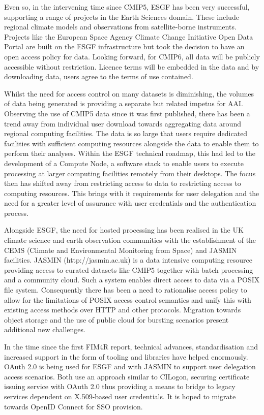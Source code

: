 \documentclass[fleqn,10pt]{wlscirep}
\begin{document}
{Even so, in the intervening time since CMIP5, ESGF has been very successful, supporting a range of projects in the Earth Sciences domain. These include regional climate models and observations from satellite-borne instruments. Projects like the European Space Agency Climate Change Initiative Open Data Portal are built on the ESGF infrastructure but took the decision to have an open access policy for data. Looking forward, for CMIP6, all data will be publicly accessible without restriction. Licence terms will be embedded in the data and by downloading data, users agree to the terms of use contained.

Whilst the need for access control on many datasets is diminishing, the volumes of data being generated is providing a separate but related impetus for AAI. Observing the use of CMIP5 data since it was first published, there has been a trend away from individual user download towards aggregating data around regional computing facilities. The data is so large that users require dedicated facilities with sufficient computing resources alongside the data to enable them to perform their analyses. Within the ESGF technical roadmap, this had led to the development of a Compute Node, a software stack to enable users to execute processing at larger computing facilities remotely from their desktops. The focus then has shifted away from restricting access to data to restricting access to computing resources. This brings with it requirements for user delegation and the need for a greater level of assurance with user credentials and the authentication process.

Alongside ESGF, the need for hosted processing has been realised in the UK climate science and earth observation communities with the establishment of the CEMS (Climate and Environmental Monitoring from Space) and JASMIN facilities. JASMIN (http://jasmin.ac.uk) is a data intensive computing resource providing access to curated datasets like CMIP5 together with batch processing and a community cloud. Such a system enables direct access to data via a POSIX file system. Consequently there has been a need to rationalise access policy to allow for the limitations of POSIX access control semantics and unify this with existing access methods over HTTP and other protocols. Migration towards object storage and the use of public cloud for bursting scenarios present additional new challenges.

In the time since the first FIM4R report, technical advances, standardisation and increased support in the form of tooling and libraries have helped enormously. OAuth 2.0 is being used for ESGF and with JASMIN to support user delegation access scenarios. Both use an approach similar to CILogon, securing certificate issuing service with OAuth 2.0 thus providing a means to bridge to legacy services dependent on X.509-based user credentials. It is hoped to migrate towards OpenID Connect for SSO provision.

}
\end{document}
